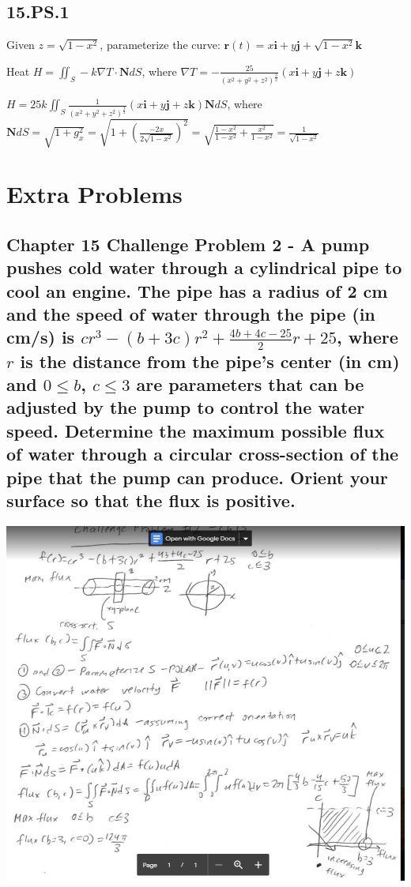 \documentclass{article}
\begin{document}
\subsection{15.PS.1}
\par\noindent\Large Given $z = \sqrt{1 - x^{2}}$, parameterize the curve: $\textbf{r}(t) = x\textbf{i} + y\textbf{j} + \sqrt{1 - x^{2}}\textbf{k}$\vspace{0.25cm}

\par\noindent\Large Heat $H = \iint_{S}-k\nabla T\cdot\textbf{N}dS$, where $\nabla T = -\frac{25}{(x^{2} + y^{2} + z^{2})^{\frac{3}{2}}}(x\textbf{i} + y\textbf{j} + z\textbf{k})$
\par\noindent\Large $H = 25k\iint_{S}\frac{1}{(x^{2} + y^{2} + z^{2})^\frac{3}{2}}(x\textbf{i} + y\textbf{j} + z\textbf{k})\textbf{N}dS$, where $\textbf{N}dS = \sqrt{1 + g_{x}^{2}} = \sqrt{1 + (\frac{-2x}{2\sqrt{1 - x^{2}}})^{2}} = \sqrt{\frac{1 - x^{2}}{1 - x^{2}} + \frac{x^{2}}{1 - x^{2}}} = \frac{1}{\sqrt{1 - x^{2}}}$

\section{Extra Problems}

\subsection{Chapter 15 Challenge Problem 2 - A pump pushes cold water through a cylindrical pipe to cool an engine.  The pipe has a radius of 2 cm and the speed of water through the pipe (in cm/s) is $cr^{3} - (b + 3c)r^{2} + \frac{4b + 4c - 25}{2}r + 25$, where $r$ is the distance from the pipe's center (in cm) and $0 \leq b$, $c \leq 3$ are parameters that can be adjusted by the pump to control the water speed.  Determine the maximum possible flux of water through a circular cross-section of the pipe that the pump can produce.  Orient your surface so that the flux is positive.}

\includegraphics[]{Cp2diagram.jpg}
\end{document}
